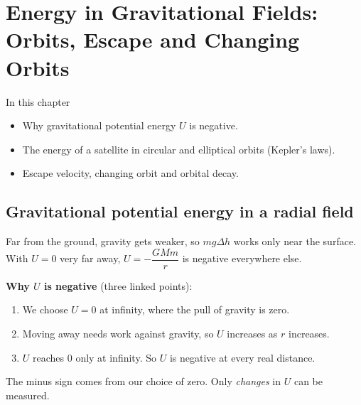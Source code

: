 \chapter[Energy in Gravitational Fields]{Energy in Gravitational Fields: Orbits, Escape and Changing Orbits}\label{ch5:chap}

\begin{summarybox}{In this chapter}
\begin{itemize}
  \item Why gravitational potential energy $U$ is negative.
  \item The energy of a satellite in circular and elliptical orbits (Kepler's laws).
  \item Escape velocity, changing orbit and orbital decay.
\end{itemize}
\end{summarybox}

\section{Gravitational potential energy in a radial field}\label{ch5:sec:gpe}

\begin{bigidea}
Far from the ground, gravity gets weaker, so $mg\Delta h$ works only near the
surface. With $U = 0$ very far away, $U = -\dfrac{GMm}{r}$ is negative
everywhere else.
\end{bigidea}

\begin{keywords}
\end{keywords}

\textbf{Why $U$ is negative} (three linked points):
\begin{enumerate}
  \item We choose $U = 0$ at infinity, where the pull of gravity is zero.
  \item Moving away needs work against gravity, so $U$ increases as $r$ increases.
  \item $U$ reaches 0 only at infinity. So $U$ is negative at every real distance.
\end{enumerate}
The minus sign comes from our choice of zero. Only \emph{changes} in $U$ can be
measured.

